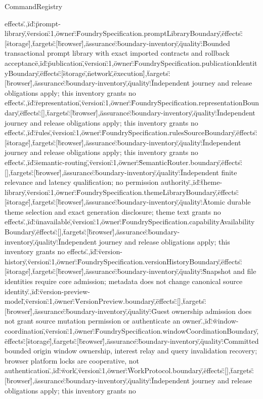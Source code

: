 \begin{lexlean}{CommandRegistry}
\begin{semanticmodule}
{effects.\"},{\"id\":\"prompt-library\",\"version\":1,\"owner\":\"FoundrySpecification.promptLibraryBoundary\",\"effects\":[\"storage\"],\"targets\":[\"browser\"],\"assurance\":\"boundary-inventory\",\"quality\":\"Bounded transactional prompt library with exact imported contracts and rollback acceptance\"},{\"id\":\"publication\",\"version\":1,\"owner\":\"FoundrySpecification.publicationIdentityBoundary\",\"effects\":[\"storage\",\"network\",\"execution\"],\"targets\":[\"browser\"],\"assurance\":\"boundary-inventory\",\"quality\":\"Independent journey and release obligations apply; this inventory grants no effects.\"},{\"id\":\"representation\",\"version\":1,\"owner\":\"FoundrySpecification.representationBoundary\",\"effects\":[],\"targets\":[\"browser\"],\"assurance\":\"boundary-inventory\",\"quality\":\"Independent journey and release obligations apply; this inventory grants no effects.\"},{\"id\":\"rules\",\"version\":1,\"owner\":\"FoundrySpecification.rulesSourceBoundary\",\"effects\":[\"storage\"],\"targets\":[\"browser\"],\"assurance\":\"boundary-inventory\",\"quality\":\"Independent journey and release obligations apply; this inventory grants no effects.\"},{\"id\":\"semantic-routing\",\"version\":1,\"owner\":\"SemanticRouter.boundary\",\"effects\":[],\"targets\":[\"browser\"],\"assurance\":\"boundary-inventory\",\"quality\":\"Independent finite relevance and latency qualification; no permission authority.\"},{\"id\":\"theme-library\",\"version\":1,\"owner\":\"FoundrySpecification.themeLibraryBoundary\",\"effects\":[\"storage\"],\"targets\":[\"browser\"],\"assurance\":\"boundary-inventory\",\"quality\":\"Atomic durable theme selection and exact generation disclosure; theme text grants no effects.\"},{\"id\":\"unavailable\",\"version\":1,\"owner\":\"FoundrySpecification.capabilityAvailabilityBoundary\",\"effects\":[],\"targets\":[\"browser\"],\"assurance\":\"boundary-inventory\",\"quality\":\"Independent journey and release obligations apply; this inventory grants no effects.\"},{\"id\":\"version-history\",\"version\":1,\"owner\":\"FoundrySpecification.versionHistoryBoundary\",\"effects\":[\"storage\"],\"targets\":[\"browser\"],\"assurance\":\"boundary-inventory\",\"quality\":\"Snapshot and file identities require core admission; metadata does not change canonical source identity.\"},{\"id\":\"version-preview-model\",\"version\":1,\"owner\":\"VersionPreview.boundary\",\"effects\":[],\"targets\":[\"browser\"],\"assurance\":\"boundary-inventory\",\"quality\":\"Guest ownership admission does not grant source mutation permission or authenticate an owner.\"},{\"id\":\"window-coordination\",\"version\":1,\"owner\":\"FoundrySpecification.windowCoordinationBoundary\",\"effects\":[\"storage\"],\"targets\":[\"browser\"],\"assurance\":\"boundary-inventory\",\"quality\":\"Committed bounded origin window ownership, interest relay and query invalidation recovery; browser platform locks are cooperative, not authentication.\"},{\"id\":\"work\",\"version\":1,\"owner\":\"WorkProtocol.boundary\",\"effects\":[],\"targets\":[\"browser\"],\"assurance\":\"boundary-inventory\",\"quality\":\"Independent journey and release obligations apply; this inventory grants no }
\end{semanticmodule}
\end{lexlean}
